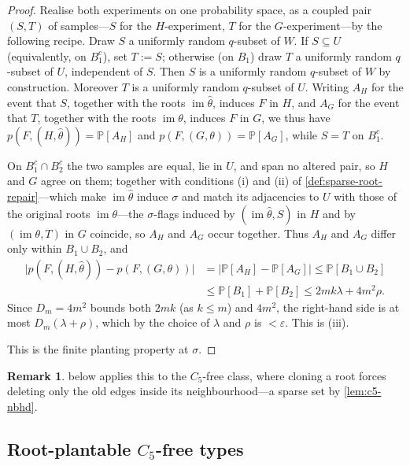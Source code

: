 \documentclass[11pt]{article}
\theoremstyle{definition}
\newtheorem{remark}[remark]{Remark}
\newcommand{\Prob}{\mathbb{P}}
\newcommand{\eps}{\varepsilon}
\begin{document}
\begin{proof}
Realise both experiments on one probability space, as a coupled pair $(S,T)$ of samples---$S$
for the $H$-experiment, $T$ for the $G$-experiment---by the following recipe.  Draw $S$ a
uniformly random $q$-subset of $W$.  If $S\subseteq U$ (equivalently, on $B_1^c$), set
$T:=S$; otherwise (on $B_1$) draw $T$ a uniformly random $q$-subset of $U$, independent of
$S$.  Then $S$ is a uniformly random $q$-subset of $W$ by construction.  Moreover $T$ is a
uniformly random $q$-subset of $U$. Writing $A_H$ for the event
that $S$, together with the roots $\operatorname{im}\widehat\theta$, induces $F$ in $H$, and
$A_G$ for the event that $T$, together with the roots $\operatorname{im}\theta$, induces $F$
in $G$, we thus have $p(F,(H,\widehat\theta))=\Prob[A_H]$ and $p(F,(G,\theta))=\Prob[A_G]$,
while $S=T$ on $B_1^c$.

On $B_1^c\cap B_2^c$ the two samples are equal, lie in $U$, and span no altered pair, so $H$
and $G$ agree on them; together with conditions (i) and (ii) of
\cref{def:sparse-root-repair}---which make $\operatorname{im}\widehat\theta$ induce $\sigma$
and match its adjacencies to $U$ with those of the original roots
$\operatorname{im}\theta$---the $\sigma$-flags induced by $(\operatorname{im}\widehat\theta,S)$
in $H$ and by $(\operatorname{im}\theta,T)$ in $G$ coincide, so $A_H$ and $A_G$ occur
together.  Thus $A_H$ and $A_G$ differ only within $B_1\cup B_2$, and
\[
\begin{aligned}
  \bigl|p(F,(H,\widehat\theta))-p(F,(G,\theta))\bigr|
  &=\bigl|\Prob[A_H]-\Prob[A_G]\bigr|
  \le\Prob[B_1\cup B_2]\\
  &\le\Prob[B_1]+\Prob[B_2]
  \le 2mk\lambda+4m^2\rho .
\end{aligned}
\]
Since $D_m=4m^2$ bounds both $2mk$ (as $k\le m$) and $4m^2$, the right-hand side is at most
$D_m(\lambda+\rho)$, which by the choice of $\lambda$ and $\rho$ is $<\eps$.  This is (iii).

This is the finite planting property at $\sigma$.
\end{proof}

\begin{remark}
 below applies this to the $C_5$-free class, where cloning a root forces
deleting only the old edges inside its neighbourhood---a sparse set by \cref{lem:c5-nbhd}.
\end{remark}

\subsection{Root-plantable \texorpdfstring{$C_5$}{C5}-free types}
\label{subsec:c5-planting}
\end{document}
